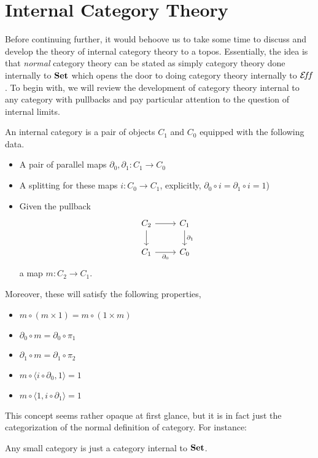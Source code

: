\section{Internal Category Theory}\label{sec:internal}

Before continuing further, it would behoove us to take some time to
discuss and develop the theory of internal category theory to a
topos. Essentially, the idea is that \emph{normal} category theory can
be stated as simply category theory done internally to $\mathbf{Set}$ which
opens the door to doing category theory internally to $\mathcal{E}\!f\!f$. To begin
with, we will review the development of category theory internal to
any category with pullbacks and pay particular attention to the
question of internal limits.
\begin{defn}\label{defn:internal:internalcat}
  An internal category is a pair of objects $C_1$ and $C_0$ equipped
  with the following data.
  \begin{itemize}
  \item A pair of parallel maps $\partial_0, \partial_1 : C_1 \to C_0$
  \item A splitting for these maps $i : C_0 \to C_1$, explicitly,
    $\partial_0 \circ i = \partial_1 \circ i = 1$)
  \item Given the pullback
    \[
      \begin{tikzcd}
        C_2 \ar[r] \ar[d] & C_1 \ar[d, "\partial_1"]\\
        C_1 \ar[r, swap, "\partial_0"] & C_0
      \end{tikzcd}
    \]
    a map $m : C_2 \to C_1$.
  \end{itemize}
  Moreover, these will satisfy the following properties,
  \begin{itemize}
  \item $m \circ (m \times 1) = m \circ (1 \times m)$
  \item $\partial_0 \circ m = \partial_0 \circ \pi_1$
  \item $\partial_1 \circ m = \partial_1 \circ \pi_2$
  \item $m \circ \langle i \circ \partial_0, 1\rangle = 1$
  \item $m \circ \langle 1, i \circ \partial_1\rangle = 1$
  \end{itemize}
\end{defn}
This concept seems rather opaque at first glance, but it is in fact
just the categorization of the normal definition of category. For
instance:
\begin{example}
  Any small category is just a category internal to $\mathbf{Set}$.
\end{example}
